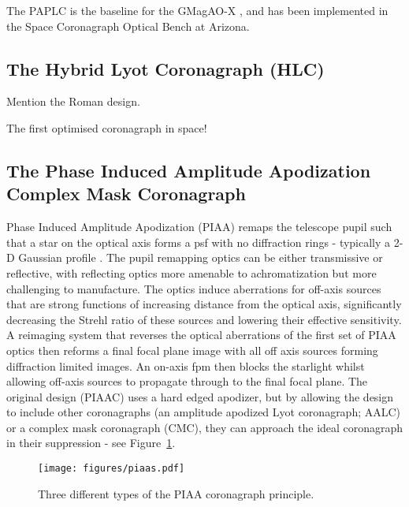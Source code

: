 \documentclass[letterpaper]{ar-1col}
\begin{document}
The PAPLC is the baseline for the GMagAO-X \citep{Males24}, and has been implemented in the Space Coronagraph Optical Bench \citep[SCOoB; ][]{Ashcraft22,vanGorkom22} at Arizona.


\subsection{The Hybrid Lyot Coronagraph (HLC)}

Mention the Roman design.

The first optimised coronagraph in space!


\subsection{The Phase Induced Amplitude Apodization Complex Mask Coronagraph}

Phase Induced Amplitude Apodization (PIAA) remaps the telescope pupil such that a star on the optical axis forms a \ac{psf} with no diffraction rings - typically a 2-D Gaussian profile \citep{Guyon03,Guyon05,Guyon14}.
%
The pupil remapping optics can be either transmissive or reflective, with reflecting optics more amenable to achromatization but more challenging to manufacture.
%
The optics induce aberrations for off-axis sources that are strong functions of increasing distance from the optical axis, significantly decreasing the Strehl ratio of these sources and lowering their effective sensitivity.
%
A reimaging system that reverses the optical aberrations of the first set of PIAA optics then reforms a final focal plane image with all off axis sources forming diffraction limited images.
%
An on-axis \ac{fpm} then blocks the starlight whilst allowing off-axis sources to propagate through to the final focal plane.
%
The original design (PIAAC) uses a hard edged apodizer, but by allowing the design to include other coronagraphs (an amplitude apodized Lyot coronagraph; AALC) or a complex mask coronagraph (CMC), they can approach the ideal coronagraph in their suppression - see Figure~\ref{fig:piaatypes}.

\begin{figure}[ht]
  \centering
  \texttt{[image: figures/piaas.pdf]}
  \caption{Three different types of the PIAA coronagraph principle.}
  \label{fig:piaatypes}
\end{figure}
\end{document}

